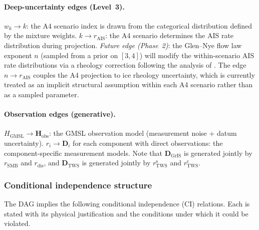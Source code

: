 \documentclass[11pt]{article}
\newcommand{\GMSL}{\text{GMSL}}
\begin{document}
\paragraph{Deep-uncertainty edges (Level~3).}
$w_k \to k$: the A4 scenario index is drawn from the categorical distribution defined by the mixture weights.  $k \to r_{\text{AIS}}$: the A4 scenario determines the AIS rate distribution during projection.  \emph{Future edge (Phase~2)}: the Glen--Nye flow law exponent $n$ (sampled from a prior on $[3, 4]$) will modify the within-scenario AIS rate distributions via a rheology correction following the analysis of \citet{getraer2025glen}.  The edge $n \to r_{\text{AIS}}$ couples the A4 projection to ice rheology uncertainty, which is currently treated as an implicit structural assumption within each A4 scenario rather than as a sampled parameter.

\paragraph{Observation edges (generative).}
$H_{\GMSL} \to \mathbf{H}_{\text{obs}}$: the GMSL observation model (measurement noise + datum uncertainty).  $r_i \to \mathbf{D}_i$ for each component with direct observations: the component-specific measurement models.  Note that $\mathbf{D}_{\text{GrIS}}$ is generated jointly by $r_{\text{SMB}}$ and $r_{\text{dis}}$, and $\mathbf{D}_{\text{TWS}}$ is generated jointly by $r_{\text{TWS}}^{\text{s}}$ and $r_{\text{TWS}}^{\text{c}}$.

\subsubsection{Conditional independence structure}
\label{sec:ci}

The DAG implies the following conditional independence (CI) relations.  Each is stated with its physical justification and the conditions under which it could be violated.
\end{document}
